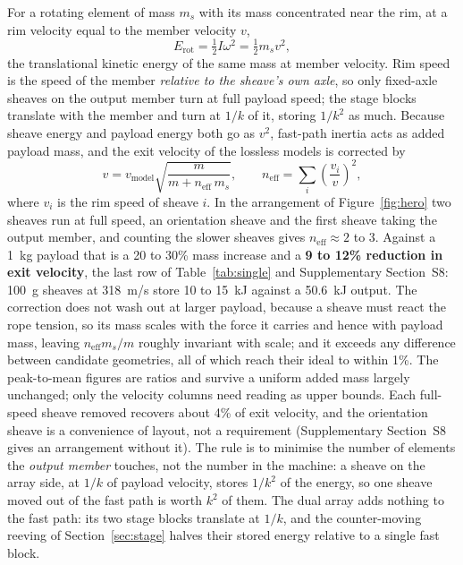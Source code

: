 \documentclass[preprint,12pt,number]{elsarticle}
\newcommand{\neff}{n_{\mathrm{eff}}}
\newcommand{\ptm}{peak-to-mean}
\begin{document}
For a rotating element of mass $m_s$ with its mass concentrated near the rim, at a rim velocity equal to the member velocity $v$,
\begin{equation}
E_{\mathrm{rot}} = \tfrac12 I \omega^2 = \tfrac12 m_s v^2,
\label{eq:erot}
\end{equation}
the translational kinetic energy of the same mass at member velocity. Rim speed is the speed of the member \emph{relative to the sheave's own axle}, so only fixed-axle sheaves on the output member turn at full payload speed; the stage blocks translate with the member and turn at $1/k$ of it, storing $1/k^2$ as much. Because sheave energy and payload energy both go as $v^2$, fast-path inertia acts as added payload mass, and the exit velocity of the lossless models is corrected by
\begin{equation}
v = v_{\mathrm{model}} \sqrt{\frac{m}{m + \neff\, m_s}}, \qquad \neff = \sum_i \left(\frac{v_i}{v}\right)^2,
\label{eq:sheave}
\end{equation}
where $v_i$ is the rim speed of sheave $i$. In the arrangement of Figure~\ref{fig:hero} two sheaves run at full speed, an orientation sheave and the first sheave taking the output member, and counting the slower sheaves gives $\neff \approx 2$ to $3$. Against a 1~kg payload that is a 20 to 30\% mass increase and a \textbf{9 to 12\% reduction in exit velocity}, the last row of Table~\ref{tab:single} and Supplementary Section~S8: 100~g sheaves at 318~m/s store 10 to 15~kJ against a 50.6~kJ output. The correction does not wash out at larger payload, because a sheave must react the rope tension, so its mass scales with the force it carries and hence with payload mass, leaving $\neff m_s/m$ roughly invariant with scale; and it exceeds any difference between candidate geometries, all of which reach their ideal to within 1\%. The \ptm{} figures are ratios and survive a uniform added mass largely unchanged; only the velocity columns need reading as upper bounds. Each full-speed sheave removed recovers about 4\% of exit velocity, and the orientation sheave is a convenience of layout, not a requirement (Supplementary Section~S8 gives an arrangement without it). The rule is to minimise the number of elements the \emph{output member} touches, not the number in the machine: a sheave on the array side, at $1/k$ of payload velocity, stores $1/k^2$ of the energy, so one sheave moved out of the fast path is worth $k^2$ of them. The dual array adds nothing to the fast path: its two stage blocks translate at $1/k$, and the counter-moving reeving of Section~\ref{sec:stage} halves their stored energy relative to a single fast block.
\end{document}

